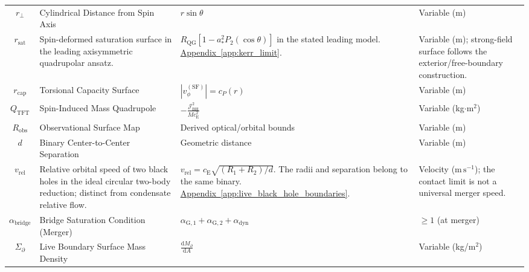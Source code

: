 \begin{longtable}{@{} c p{5.5cm} p{4cm} p{3.5cm} @{}}
$r_\perp$ & Cylindrical Distance from Spin Axis & $r\sin\theta$ & Variable (m) \\

$r_{\mathrm{sat}}$ & {\raggedright Spin-deformed saturation surface in the leading axisymmetric quadrupolar ansatz.\par} & {\raggedright $R_{\mathrm{QG}}[1-a_*^2P_2(\cos\theta)]$ in the stated leading model. \newline \hyperref[app:kerr_limit]{Appendix~\ref*{app:kerr_limit}}.\par} & {\raggedright Variable ($\mathrm m$); strong-field surface follows the exterior/free-boundary construction.\par} \\

$r_{\mathrm{cap}}$ & Torsional Capacity Surface & $\left| v_{\phi}^{(\mathrm{SF})} \right| = c_P(r)$ & Variable (m) \\

$Q_{\mathrm{TFT}}$ & Spin-Induced Mass Quadrupole & $-\frac{\mathcal{J}_{\mathrm{BH}}^2}{M c_{\mathrm{E}}^2}$ & Variable (kg$\cdot$m$^2$) \\

$R_{\mathrm{obs}}$ & Observational Surface Map & Derived optical/orbital bounds & Variable (m) \\

$d$ & Binary Center-to-Center Separation & Geometric distance & Variable (m) \\

$v_{\mathrm{rel}}$ & {\raggedright Relative orbital speed of two black holes in the ideal circular two-body reduction; distinct from condensate relative flow.\par} & {\raggedright $v_{\mathrm{rel}}=c_{\mathrm E}\sqrt{(R_1+R_2)/d}$. The radii and separation belong to the same binary. \newline \hyperref[app:live_black_hole_boundaries]{Appendix~\ref*{app:live_black_hole_boundaries}}.\par} & {\raggedright Velocity ($\mathrm{m\,s^{-1}}$); the contact limit is not a universal merger speed.\par} \\

$\alpha_{\mathrm{bridge}}$ & Bridge Saturation Condition (Merger) & $\alpha_{\mathrm{G},1} + \alpha_{\mathrm{G},2} + \alpha_{\mathrm{dyn}}$ & $\ge 1$ (at merger) \\

$\Sigma_{\partial}$ & Live Boundary Surface Mass Density & $\frac{\mathrm{d}M_{\partial}}{\mathrm{d}A}$ & Variable (kg/m$^2$) \\


\end{longtable}
